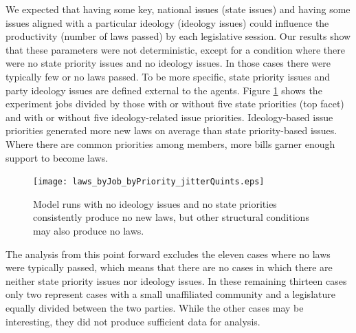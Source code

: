 \documentclass[pdftex,12pt]{llncs}
\begin{document}
We expected that having some key, national issues (state issues) and having some issues aligned with a particular ideology (ideology issues) could influence the productivity (number of laws passed) by each legislative session. 
Our results show that these parameters were not deterministic, except for a condition where there were no state priority issues and no ideology issues.
In those cases there were typically few or no laws passed. 
To be more specific, state priority issues and party ideology issues are defined external to the agents. 
Figure \ref{bypriority} shows the experiment jobs divided by those with or without five state priorities (top facet) and with or without five ideology-related issue priorities. 
Ideology-based issue priorities generated more new laws on average than state priority-based issues. 
Where there are common priorities among members, more bills garner enough support to become laws. 

\begin{figure}
  \texttt{[image: laws\_byJob\_byPriority\_jitterQuints.eps]}
\caption[ ]{Model runs with no ideology issues and no state priorities consistently produce no new laws, but other structural conditions may also produce no laws.}
 \label{bypriority}
  \vspace{-1cm}
\end{figure}

The analysis from this point forward excludes the eleven cases where no laws were typically passed, which means that there are no cases in which there are neither state priority issues nor ideology issues. 
In these remaining thirteen cases only two represent cases with a small unaffiliated community and a legislature equally divided between the two parties. 
While the other cases may be interesting, they did not produce sufficient data for analysis.
\end{document}
